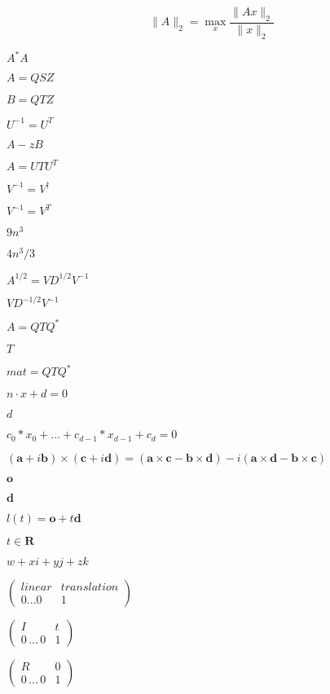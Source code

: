 \documentclass{article}
\begin{document}
\[ \|A\|_2 = \max_x \frac{\|Ax\|_2}{\|x\|_2} \]
\pagebreak

$ A^*A $
\pagebreak

$ A = Q S Z $
\pagebreak

$ B = Q T Z $
\pagebreak

$ U^{-1} = U^T $
\pagebreak

$ A - z B $
\pagebreak

$ A = U T U^T $
\pagebreak

$ V^{-1} = V^{\dagger} $
\pagebreak

$ V^{-1} = V^T $
\pagebreak

$ 9n^3 $
\pagebreak

$ 4n^3/3 $
\pagebreak

$ A^{1/2} = V D^{1/2} V^{-1} $
\pagebreak

$ V D^{-1/2} V^{-1} $
\pagebreak

$ A = Q T Q^* $
\pagebreak

$ T $
\pagebreak

$ mat = Q T Q^* $
\pagebreak

$ n \cdot x + d = 0 $
\pagebreak

$ d $
\pagebreak

$ c_0*x_0 + ... + c_{d-1}*x_{d-1} + c_d = 0 $
\pagebreak

$ (\mathbf{a}+i\mathbf{b}) \times (\mathbf{c}+i\mathbf{d}) = (\mathbf{a} \times \mathbf{c} - \mathbf{b} \times \mathbf{d}) - i(\mathbf{a} \times \mathbf{d} - \mathbf{b} \times \mathbf{c})$
\pagebreak

$ \mathbf{o} $
\pagebreak

$ \mathbf{d} $
\pagebreak

$ l(t) = \mathbf{o} + t \mathbf{d} $
\pagebreak

$ t \in \mathbf{R} $
\pagebreak

$ w+xi+yj+zk $
\pagebreak

$ \left( \begin{array}{cc} linear & translation\\ 0 ... 0 & 1 \end{array} \right) $
\pagebreak

$ \left( \begin{array}{cc} I & t \\ 0\,...\,0 & 1 \end{array} \right) $
\pagebreak

$ \left( \begin{array}{cc} R & 0\\ 0\,...\,0 & 1 \end{array} \right) $
\pagebreak
\end{document}
